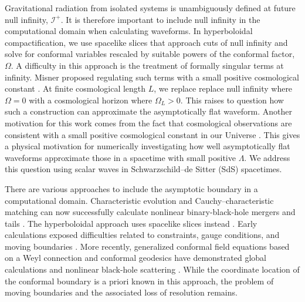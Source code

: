 \documentclass[
 aps,
 prd,
 reprint,
 superscriptaddress,
 nofootinbib,
 longbibliography
]{revtex4-2}
\newcommand{\scri}{\mathscr{I}}
\begin{document}
Gravitational radiation from isolated systems is unambiguously defined at future null infinity, $\scri^+$. It is therefore important to include null infinity in the computational domain when calculating waveforms. In hyperboloidal compactification, we use spacelike slices that approach cuts of null infinity and solve for conformal variables rescaled by suitable powers of the conformal factor, $\Omega$. A difficulty in this approach is the treatment of formally singular terms at infinity. Misner proposed regulating such terms with a small positive cosmological constant \cite{misner_hyperboloidal_2006,misner_over_2006,misner_excising_2006}. At finite cosmological length $L$, we replace replace null infinity where $\Omega=0$ with a cosmological horizon where $\Omega_L>0$.  This raises to question how such a construction can approximate the asymptotically flat waveform. Another motivation for this work comes from the fact that cosmological observations are consistent with a small positive cosmological constant in our Universe \cite{Planck:2018cosmology}.  This gives a physical
motivation for numerically investigating how well asymptotically flat waveforms approximate those in a spacetime with small positive $\Lambda$.  We address this question using scalar waves in Schwarzschild--de Sitter (SdS) spacetimes.

There are various approaches to include the asymptotic boundary in a computational domain. Characteristic evolution and Cauchy--characteristic matching can now successfully calculate nonlinear binary-black-hole mergers and tails \cite{Winicour:2012characteristic,MaEtAl:2025CCM}.  The hyperboloidal approach uses spacelike slices instead \cite{friedrich1983cauchy}. Early calculations exposed difficulties related to constraints, gauge conditions, and moving boundaries \cite{Frauendiener:1998II,Hubner:1999scheme,Hubner:2001timelike,FrauendienerHein:2002,Husa:2002problems}.  More recently, generalized conformal field equations based on a Weyl connection and conformal geodesics have demonstrated global calculations and nonlinear black-hole scattering \cite{Friedrich:1995general,Friedrich:2003geodesics,
zenginouglu2007numerical, zenginouglu2007conformal, BeyerEtAl:2017GCFE,FrauendienerStevens:2021massloss,
FrauendienerStevensThwala:2025,CamdenEtAl:2025,
FrauendienerStevens:2023compactification}. While the coordinate location of the conformal boundary is a priori known in this approach, the problem of moving boundaries and the associated loss of resolution remains.
\end{document}
